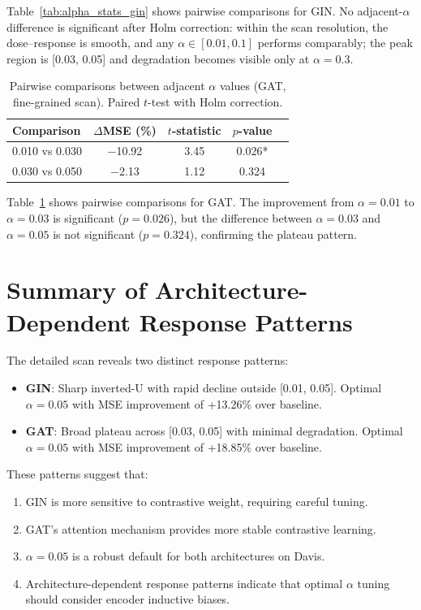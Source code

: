 \documentclass[10pt,a4paper]{article}
\begin{document}
Table~\ref{tab:alpha_stats_gin} shows pairwise comparisons for GIN. No adjacent-$\alpha$ difference is significant after Holm correction: within the scan resolution, the dose--response is smooth, and any $\alpha \in [0.01, 0.1]$ performs comparably; the peak region is [0.03, 0.05] and degradation becomes visible only at $\alpha=0.3$.

\begin{table}[!h]
\caption{Pairwise comparisons between adjacent $\alpha$ values (GAT, fine-grained scan). Paired $t$-test with Holm correction.}
\label{tab:alpha_stats_gat}
\centering
\begin{tabular}{lcccc}
\toprule
Comparison & $\Delta$MSE (\%) & $t$-statistic & $p$-value \\
\midrule
0.010 vs 0.030 & $-$10.92 & 3.45 & 0.026* \\
0.030 vs 0.050 & $-$2.13 & 1.12 & 0.324 \\
\bottomrule
\end{tabular}
\end{table}

Table~\ref{tab:alpha_stats_gat} shows pairwise comparisons for GAT. The improvement from $\alpha=0.01$ to $\alpha=0.03$ is significant ($p=0.026$), but the difference between $\alpha=0.03$ and $\alpha=0.05$ is not significant ($p=0.324$), confirming the plateau pattern.

\section{Summary of Architecture-Dependent Response Patterns}

The detailed scan reveals two distinct response patterns:

\begin{itemize}
\item \textbf{GIN}: Sharp inverted-U with rapid decline outside [0.01, 0.05]. Optimal $\alpha=0.05$ with MSE improvement of +13.26\% over baseline.
\item \textbf{GAT}: Broad plateau across [0.03, 0.05] with minimal degradation. Optimal $\alpha=0.05$ with MSE improvement of +18.85\% over baseline.
\end{itemize}

These patterns suggest that:
\begin{enumerate}
\item GIN is more sensitive to contrastive weight, requiring careful tuning.
\item GAT's attention mechanism provides more stable contrastive learning.
\item $\alpha=0.05$ is a robust default for both architectures on Davis.
\item Architecture-dependent response patterns indicate that optimal $\alpha$ tuning should consider encoder inductive biases.
\end{enumerate}
\end{document}

